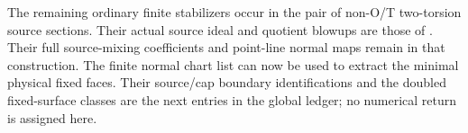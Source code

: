 The remaining ordinary finite stabilizers occur in
the pair of non-O/T two-torsion source sections. Their
actual source ideal and quotient blowups are those of
.
Their full source-mixing coefficients and point-line
normal maps remain in that construction. The finite
normal chart list can now be used to extract the
minimal physical fixed faces. Their source/cap boundary
identifications and the doubled fixed-surface classes
are the next entries in the global ledger; no numerical
return is assigned here.

